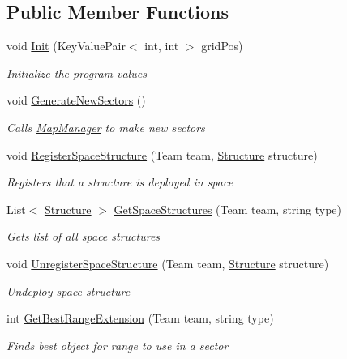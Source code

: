 \subsection*{Public Member Functions}
\begin{DoxyCompactItemize}
\item 
void \hyperlink{class_sector_af16372ab07bfaff9c7d1f39a4240f079}{Init} (Key\+Value\+Pair$<$ int, int $>$ grid\+Pos)
\begin{DoxyCompactList}\small\item\em Initialize the program values \end{DoxyCompactList}\item 
void \hyperlink{class_sector_af8b84b2f8fa4ccdc2cf58a9f32fb0b28}{Generate\+New\+Sectors} ()
\begin{DoxyCompactList}\small\item\em Calls \hyperlink{class_map_manager}{Map\+Manager} to make new sectors \end{DoxyCompactList}\item 
void \hyperlink{class_sector_ae0e35f65cbd250cd36c0372213ca8191}{Register\+Space\+Structure} (Team team, \hyperlink{class_structure}{Structure} structure)
\begin{DoxyCompactList}\small\item\em Registers that a structure is deployed in space \end{DoxyCompactList}\item 
List$<$ \hyperlink{class_structure}{Structure} $>$ \hyperlink{class_sector_a1574ef79ca69119b547b58968f67a9fc}{Get\+Space\+Structures} (Team team, string type)
\begin{DoxyCompactList}\small\item\em Gets list of all space structures \end{DoxyCompactList}\item 
void \hyperlink{class_sector_a8c67595872a205af83ceba5c97629519}{Unregister\+Space\+Structure} (Team team, \hyperlink{class_structure}{Structure} structure)
\begin{DoxyCompactList}\small\item\em Undeploy space structure \end{DoxyCompactList}\item 
int \hyperlink{class_sector_a4a2f9551839eac2173a5f0f213402b36}{Get\+Best\+Range\+Extension} (Team team, string type)
\begin{DoxyCompactList}\small\item\em Finds best object for range to use in a sector \end{DoxyCompactList}\item 

\end{DoxyCompactItemize}
